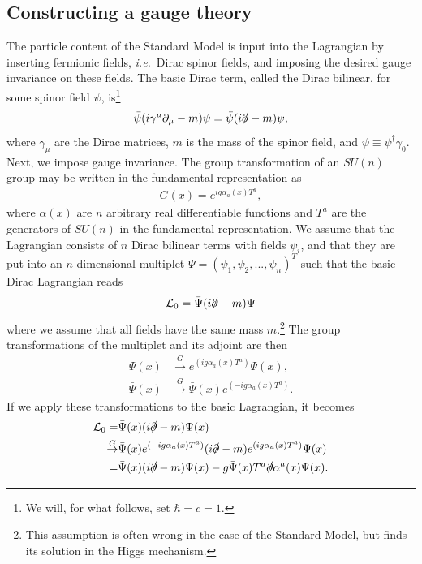 \subsection{Constructing a gauge theory}
The particle content of the Standard Model is input into the Lagrangian by inserting fermionic fields, {\it i.e.}\ Dirac spinor fields, and imposing the desired gauge invariance on these fields. The basic Dirac term, called the Dirac bilinear, for some spinor field $\psi$, is\footnote{We will, for what follows, set $\hbar = c = 1$.} 
\begin{align}
	\bar \psi (i\gamma^\mu \partial_\mu - m) \psi = \bar \psi (i\slashed\partial - m)\psi, \label{eq:diracbilinear}
\end{align}
where $\gamma_\mu$ are the Dirac matrices, $m$ is the mass of the spinor field, and $\bar\psi \equiv \psi^\dag \gamma_0$. Next, we impose gauge invariance. The group transformation of an $SU(n)$ group may be written in the fundamental representation as
\begin{align}
	G(x) = e^{ig\alpha_a(x)T^a},
\end{align}
where $\alpha(x)$ are $n$ arbitrary real differentiable functions and $T^a$ are the generators of $SU(n)$ in the fundamental representation. We assume that the Lagrangian consists of $n$ Dirac bilinear terms with fields $\psi_i$, and that they are put into an $n$-dimensional multiplet $\Psi = (\psi_1, \psi_2, ..., \psi_n)^T$ such that the basic Dirac Lagrangian reads
\begin{align}
	\mathcal{L}_0 = \bar\Psi(i\slashed\partial - m)\Psi
\end{align}
where we assume that all fields have the same mass $m$.\footnote{This assumption is often wrong in the case of the Standard Model, but finds its solution in the Higgs mechanism.} The group transformations of the multiplet and its adjoint are then 
\begin{align}
	\Psi(x) &\overset{G}{\to} e^{(ig\alpha_a(x)T^a)} \Psi(x),\\
	\bar\Psi(x) &\overset{G}{\to} \bar\Psi(x) e^{(-ig\alpha_a(x)T^a)}.\nonumber
\end{align}
If we apply these transformations to the basic Lagrangian, it becomes
\begin{align}
	\mathcal{L}_0 = &\bar\Psi(x)(i\slashed\partial - m)\Psi(x)\nonumber\\
	\overset{G}{\to} &\bar\Psi(x) e^{(-ig\alpha_a(x)T^a)}(i\slashed\partial - m)e^{(ig\alpha_a(x)T^a)} \Psi(x)\\
	=	&\bar\Psi(x)(i\slashed\partial - m)\Psi(x) - g\bar\Psi(x) T^a\slashed\partial \alpha^a(x) \Psi(x).\nonumber
\end{align}
